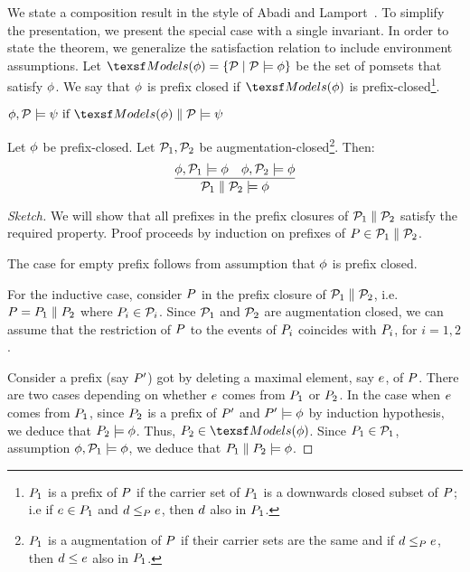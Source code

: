 We state a composition result in the style of Abadi and
Lamport~\cite{Abadi:1993:CS:151646.151649}.  To simplify the presentation, we
present the special case with a single invariant.
In order to state the theorem, we generalize the satisfaction relation to
include environment assumptions.  Let
\begin{math}
  \mods{(\afo)} = \{ \aPSS \mid \aPSS \models \afo \}
\end{math}
be the set of pomsets that
satisfy $\phi$.
We say that $\phi$ is prefix closed if $\mods{(\afo)}$
is prefix-closed\footnote{$P_1$ is a prefix of $P$ if the carrier set
  of $P_1$ is a downwards closed subset of $P$; i.e if
  $e \in P_1$ and $ d \le_{P} e$, then $d$ also in
  $P_1$.}.
\begin{definition}
  \begin{math}
    \afo, \aPSS \models \bfo  \text{ if } \mods{(\afo)} \parallel \aPSS \models \bfo
  \end{math}
\end{definition}
\begin{proposition}%
  Let $\phi$ be prefix-closed.  Let $\mathcal{P}_1, \mathcal{P}_2$ be
  augmentation-closed\footnote{$P_1$ is a augmentation of $P$ if their
    carrier sets are the same and if $ d \le_{P} e$, then
    $d \le e$ also in $P_1$.}.  Then:
  \begin{displaymath}
    \frac{
      \phi, \mathcal{P}_1 \models\phi
      \quad
      \phi, \mathcal{P}_2 \models\phi
    }{\mathcal{P}_1 \parallel \mathcal{P}_2 \models \phi}
  \end{displaymath}
\end{proposition}
\begin{proof}[Sketch]
  We will show that all prefixes in the prefix closures of
  $\mathcal{P}_1 \parallel \mathcal{P}_2$ satisfy the required property.  Proof proceeds
  by induction on prefixes of $P \in \mathcal{P}_1 \parallel \mathcal{P}_2$.

  The case for empty prefix  follows from assumption that  $\phi$ is prefix closed.  

  For the inductive case, consider $P$ in the prefix closure of
  $\mathcal{P}_1 \parallel \mathcal{P}_2$, i.e. $P = P_1 \parallel P_2$ where
  $P_i \in \mathcal{P}_i$.  Since $\mathcal{P}_1$ and $\mathcal{P}_2$ are augmentation
  closed, we can assume that the restriction of $P$ to the events of
  $P_i$ coincides with $P_i$, for $i=1,2$.

  Consider a prefix (say $P'$) got by deleting a maximal element, say
  $e$, of $P$.  There are two cases depending on whether $e$ comes
  from $P_1$ or $P_2$.  In the case when $e$ comes from $P_1$,
  since $P_2$ is a prefix of $P'$ and $P' \models \phi$ by induction
  hypothesis, we deduce that $P_2 \models \phi$.  Thus,
  $\aPS_2 \in \mods{(\afo)}$.  Since $P_1 \in \mathcal{P}_1$, assumption
  $\phi, \mathcal{P}_1 \models\phi$, we deduce that
  $P_1 \parallel P_2 \models \phi$.
\end{proof}


